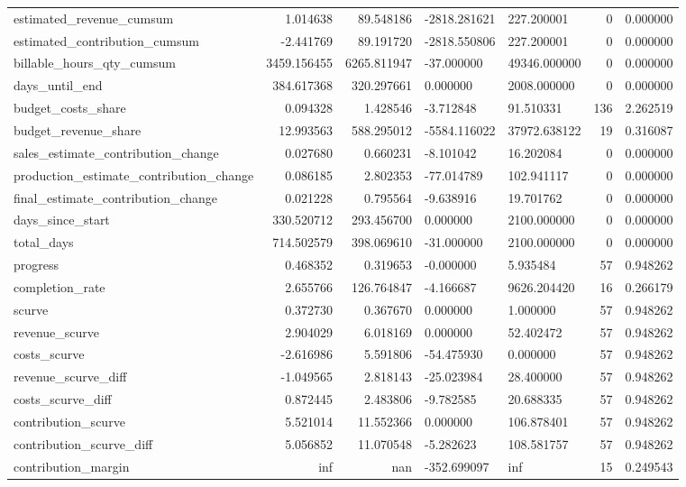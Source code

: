 \begin{landscape}
\begin{longtable}[h!]{lrrllrr}
estimated_revenue_cumsum & 1.014638 & 89.548186 & -2818.281621 & 227.200001 & 0 & 0.000000 \\
estimated_contribution_cumsum & -2.441769 & 89.191720 & -2818.550806 & 227.200001 & 0 & 0.000000 \\
billable_hours_qty_cumsum & 3459.156455 & 6265.811947 & -37.000000 & 49346.000000 & 0 & 0.000000 \\
days_until_end & 384.617368 & 320.297661 & 0.000000 & 2008.000000 & 0 & 0.000000 \\
budget_costs_share & 0.094328 & 1.428546 & -3.712848 & 91.510331 & 136 & 2.262519 \\
budget_revenue_share & 12.993563 & 588.295012 & -5584.116022 & 37972.638122 & 19 & 0.316087 \\
sales_estimate_contribution_change & 0.027680 & 0.660231 & -8.101042 & 16.202084 & 0 & 0.000000 \\
production_estimate_contribution_change & 0.086185 & 2.802353 & -77.014789 & 102.941117 & 0 & 0.000000 \\
final_estimate_contribution_change & 0.021228 & 0.795564 & -9.638916 & 19.701762 & 0 & 0.000000 \\
days_since_start & 330.520712 & 293.456700 & 0.000000 & 2100.000000 & 0 & 0.000000 \\
total_days & 714.502579 & 398.069610 & -31.000000 & 2100.000000 & 0 & 0.000000 \\
progress & 0.468352 & 0.319653 & -0.000000 & 5.935484 & 57 & 0.948262 \\
completion_rate & 2.655766 & 126.764847 & -4.166687 & 9626.204420 & 16 & 0.266179 \\
scurve & 0.372730 & 0.367670 & 0.000000 & 1.000000 & 57 & 0.948262 \\
revenue_scurve & 2.904029 & 6.018169 & 0.000000 & 52.402472 & 57 & 0.948262 \\
costs_scurve & -2.616986 & 5.591806 & -54.475930 & 0.000000 & 57 & 0.948262 \\
revenue_scurve_diff & -1.049565 & 2.818143 & -25.023984 & 28.400000 & 57 & 0.948262 \\
costs_scurve_diff & 0.872445 & 2.483806 & -9.782585 & 20.688335 & 57 & 0.948262 \\
contribution_scurve & 5.521014 & 11.552366 & 0.000000 & 106.878401 & 57 & 0.948262 \\
contribution_scurve_diff & 5.056852 & 11.070548 & -5.282623 & 108.581757 & 57 & 0.948262 \\
contribution_margin & inf & nan & -352.699097 & inf & 15 & 0.249543 \\

\end{longtable}
\end{landscape}
